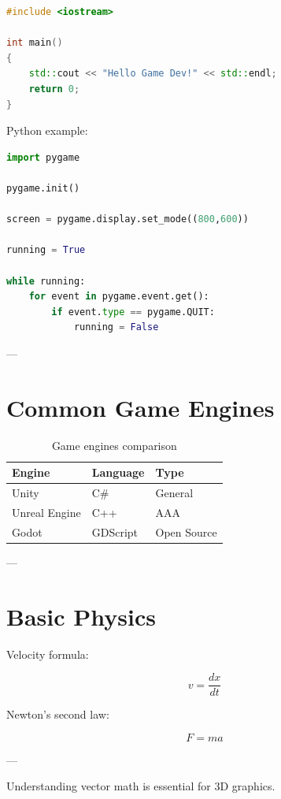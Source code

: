 \documentclass[11pt,oneside]{book}
\begin{document}
\begin{lstlisting}[language=C++]
#include <iostream>

int main()
{
    std::cout << "Hello Game Dev!" << std::endl;
    return 0;
}
\end{lstlisting}

Python example:

\begin{lstlisting}[language=Python]
import pygame

pygame.init()

screen = pygame.display.set_mode((800,600))

running = True

while running:
    for event in pygame.event.get():
        if event.type == pygame.QUIT:
            running = False
\end{lstlisting}

---


\section{Common Game Engines}

\begin{table}[h]
\centering
\begin{tabular}{lll}
\toprule
Engine & Language & Type \\
\midrule
Unity & C\# & General \\
Unreal Engine & C++ & AAA \\
Godot & GDScript & Open Source \\
\bottomrule
\end{tabular}
\caption{Game engines comparison}
\end{table}

---


\section{Basic Physics}

Velocity formula:

\[
v = \frac{dx}{dt}
\]

Newton's second law:

\[
F = ma
\]

---


\begin{tip}
Understanding vector math is essential for 3D graphics.
\end{tip}
\end{document}
